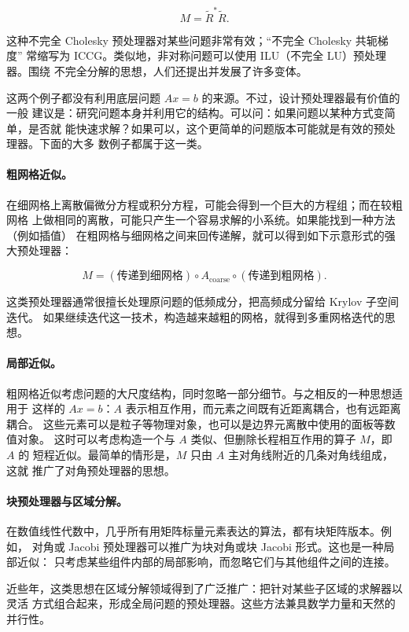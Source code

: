 \documentclass[UTF8,fontset=none,12pt]{ctexart}
\begin{document}
\[
M=\widetilde R^*\widetilde R.
\]

这种不完全 Cholesky 预处理器对某些问题非常有效；“不完全 Cholesky 共轭梯度”
常缩写为 ICCG。类似地，非对称问题可以使用 ILU（不完全 LU）预处理器。围绕
不完全分解的思想，人们还提出并发展了许多变体。

这两个例子都没有利用底层问题 $Ax=b$ 的来源。不过，设计预处理器最有价值的一般
建议是：研究问题本身并利用它的结构。可以问：如果问题以某种方式变简单，是否就
能快速求解？如果可以，这个更简单的问题版本可能就是有效的预处理器。下面的大多
数例子都属于这一类。

\paragraph{粗网格近似。}
在细网格上离散偏微分方程或积分方程，可能会得到一个巨大的方程组；而在较粗网格
上做相同的离散，可能只产生一个容易求解的小系统。如果能找到一种方法（例如插值）
在粗网格与细网格之间来回传递解，就可以得到如下示意形式的强大预处理器：

\begin{equation}
M=(\text{传递到细网格})\circ A_{\text{coarse}}\circ
(\text{传递到粗网格}).
\tag{40.5}
\end{equation}

这类预处理器通常很擅长处理原问题的低频成分，把高频成分留给 Krylov 子空间迭代。
如果继续迭代这一技术，构造越来越粗的网格，就得到多重网格迭代的思想。

\paragraph{局部近似。}
粗网格近似考虑问题的大尺度结构，同时忽略一部分细节。与之相反的一种思想适用于
这样的 $Ax=b$：$A$ 表示相互作用，而元素之间既有近距离耦合，也有远距离耦合。
这些元素可以是粒子等物理对象，也可以是边界元离散中使用的面板等数值对象。
这时可以考虑构造一个与 $A$ 类似、但删除长程相互作用的算子 $M$，即 $A$ 的
短程近似。最简单的情形是，$M$ 只由 $A$ 主对角线附近的几条对角线组成，这就
推广了对角预处理器的思想。

\paragraph{块预处理器与区域分解。}
在数值线性代数中，几乎所有用矩阵标量元素表达的算法，都有块矩阵版本。例如，
对角或 Jacobi 预处理器可以推广为块对角或块 Jacobi 形式。这也是一种局部近似：
只考虑某些组件内部的局部影响，而忽略它们与其他组件之间的连接。

近些年，这类思想在区域分解领域得到了广泛推广：把针对某些子区域的求解器以灵活
方式组合起来，形成全局问题的预处理器。这些方法兼具数学力量和天然的并行性。
\end{document}
